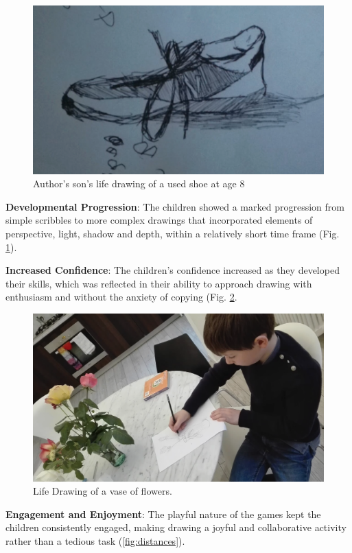 \documentclass{article}
\begin{document}
\begin{figure}
    \centering
    \includegraphics[width=0.5\linewidth]{Screenshot 2025-01-06 at 08.42.30.png}
    \caption{Author's son's life drawing of a used shoe at age 8}
    \label{fig:shoe}
\end{figure}

\textbf{Developmental Progression}: The children showed a marked progression from simple scribbles to more complex drawings that incorporated elements of perspective, light, shadow and depth, within a relatively short time frame (Fig. \ref{fig:shoe}).

\textbf{Increased Confidence}: The children’s confidence increased as they developed their skills, which was reflected in their ability to approach drawing with enthusiasm and without the anxiety of copying (Fig. \ref{fig:flowers}.

\begin{figure}
    \centering
    \includegraphics[width=0.5\linewidth]{Screenshot 2025-01-06 at 08.40.09.png}
    \caption{Life Drawing of a vase of flowers. }
    \label{fig:flowers}
\end{figure}

\textbf{Engagement and Enjoyment}: The playful nature of the games kept the children consistently engaged, making drawing a joyful and collaborative activity rather than a tedious task (\ref{fig:distances}).
\end{document}
